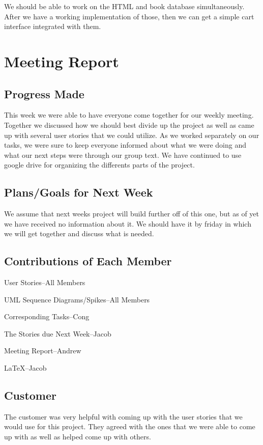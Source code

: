 \documentclass[12pt]{article}
\begin{document}
		We should be able to work on the HTML and book database simultaneously. 
		After we have a working implementation of those, then we can get a simple cart interface integrated with them.



	\section{Meeting Report}
		\subsection{Progress Made}
		This week we were able to have everyone come together for our weekly meeting. 
		Together we discussed how we should best divide up the project as well as came up with several user stories that we could utilize. 
		As we worked separately on our tasks, we were sure to keep everyone informed about what we were doing and what our next steps were through our group text. 
		We have continued to use google drive for organizing the differents parts of the project.  

		\subsection{Plans/Goals for Next Week}
		We assume that next weeks project will build further off of this one, but as of yet we have received no information about it. 
		We should have it by friday in which we will get together and discuss what is needed.

		\subsection{Contributions of Each Member}
		\quad User Stories--All Members \par
		UML Sequence Diagrams/Spikes--All Members \par
		Corresponding Tasks--Cong \par
		The Stories due Next Week--Jacob \par
		Meeting Report--Andrew \par
		LaTeX--Jacob

		\subsection{Customer}
		The customer was very helpful with coming up with the user stories that we would use for this project. 
		They agreed with the ones that we were able to come up with as well as helped come up with others.

	
\end{document}

